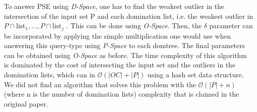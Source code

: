 \documentclass[runningheads]{llncs}
\begin{document}
To answer PSE using \emph{D-Space}, one has to find the weakest outlier in the intersection of the input set P and each domination list, i.e. the weakest outlier in $P \cap \text{list}_1, \ldots ,P\cap\text{list}_j$ . This can be done using \emph{O-Space}. Then, the $\delta$ parameter can be incorporated by applying the simple multiplication one would use when answering this query-type using \emph{P-Space} to each domtree. The final parameters can be obtained using \emph{O-Space} as before. The time complexity of this algorithm is dominated by the cost of intersecting the input set and the outliers in the domination lists, which can in $\mathcal{O}(|OC| + |P|)$ using a hash set data structure. We did not find an algorithm that solves this problem with the $\mathcal{O}(|P| + n)$ (where n is the number of domination lists) complexity that is claimed in the original paper.



%
%


  
\end{document}
